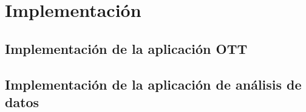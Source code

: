 \chapter{Implementación}
\label{sec:implementacion}



\section{Implementación de la aplicación OTT}



\section{Implementación de la aplicación de análisis de datos}

